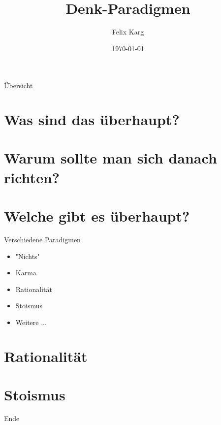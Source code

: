 \documentclass[12pt,compress,ngerman,utf8,t]{beamer}
\date{\today}
\institute{University of Freiburg}
\title{Denk-Paradigmen}
\author{Felix Karg}
\begin{document}
\maketitle

\begin{frame}{Übersicht}
    \tableofcontents
\end{frame}

\section{Was sind das überhaupt?}


\section{Warum sollte man sich danach richten?}


\section{Welche gibt es überhaupt?}
\begin{frame}{Verschiedene Paradigmen}
    \begin{itemize}
        \item "Nichts"
        \item Karma
        \item Rationalität
        \item Stoismus
        \item Weitere ...
    \end{itemize}
\end{frame}


\section{Rationalität}


\section{Stoismus}


\begin{frame}[standout]
    Ende
\end{frame}
\end{document}

